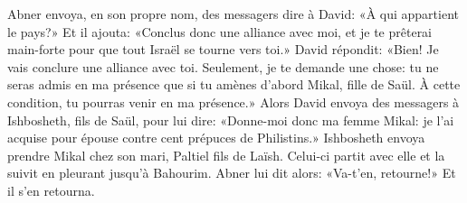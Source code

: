 Abner envoya, en son propre nom, des messagers dire à David:
	«À qui appartient le pays?»
Et il ajouta: «Conclus donc une alliance avec moi,
	et je te prêterai main-forte pour que tout Israël se tourne vers toi.»
David répondit: «Bien! Je vais conclure une alliance avec toi.
Seulement, je te demande une chose:
	tu ne seras admis en ma présence que si tu amènes d’abord Mikal, fille de Saül.
À cette condition, tu pourras venir en ma présence.»
Alors David envoya des messagers à Ishbosheth, fils de Saül, pour lui dire:
	«Donne-moi donc ma femme Mikal:
	je l’ai acquise pour épouse contre cent prépuces de Philistins.»
Ishbosheth envoya prendre Mikal chez son mari, Paltiel fils de Laïsh.
Celui-ci partit avec elle et la suivit en pleurant jusqu’à Bahourim.
	Abner lui dit alors: «Va-t’en, retourne!» Et il s’en retourna.
